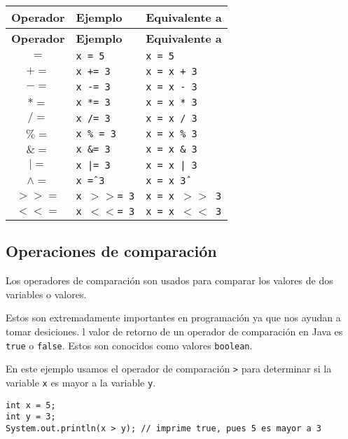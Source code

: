 \documentclass[12pt]{article}
\theoremstyle{largebreak}
\begin{document}
    \begin{longtable}{c l l}
    \toprule
    \textbf{Operador} & \textbf{Ejemplo} & \textbf{Equivalente a} \\
    \midrule
    \endfirsthead

    \midrule
    \textbf{Operador} & \textbf{Ejemplo} & \textbf{Equivalente a} \\
    \midrule
    \endhead

    \bottomrule
    \endfoot

    $=$ & \texttt{x = 5} & \texttt{x = 5} \\
    $+=$ & \texttt{x += 3} & \texttt{x = x + 3} \\
    $-=$ & \texttt{x -= 3} & \texttt{x = x - 3} \\
    $*=$ & \texttt{x *= 3} & \texttt{x = x * 3} \\
    $/=$ & \texttt{x /= 3} & \texttt{x = x / 3} \\
    $\%=$ & \texttt{x \% = 3} & \texttt{x = x \% 3} \\
    $\&=$ & \texttt{x \&= 3} & \texttt{x = x \& 3} \\
    $|=$ & \texttt{x |= 3} & \texttt{x = x | 3} \\
    $\wedge=$ & \texttt{x \^= 3} & \texttt{x = x \^ 3} \\
    $>>=$ & \texttt{x $>>$= 3} & \texttt{x = x $>>$ 3} \\
    $<<=$ & \texttt{x $<<$= 3} & \texttt{x = x $<<$ 3} \\
    \end{longtable}

    \subsection{Operaciones de comparación}

    Los operadores de comparación son usados para comparar los valores de dos variables o valores.
    
    Estos son extremadamente importantes en programación ya que nos ayudan a tomar desiciones. l valor de retorno de un operador de comparación en Java es \lstinline|true| o \lstinline|false|. Estos son conocidos como valores \lstinline|boolean|.

    \begin{exa}
        En este ejemplo usamos el operador de comparación \lstinline|>| para determinar si la variable \lstinline|x| es mayor a la variable \lstinline|y|.
        \begin{lstlisting}[caption={Operador comparación.},label=DescriptiveLabel]
int x = 5;
int y = 3;
System.out.println(x > y); // imprime true, pues 5 es mayor a 3
        \end{lstlisting}
    \end{exa}
\end{document}
